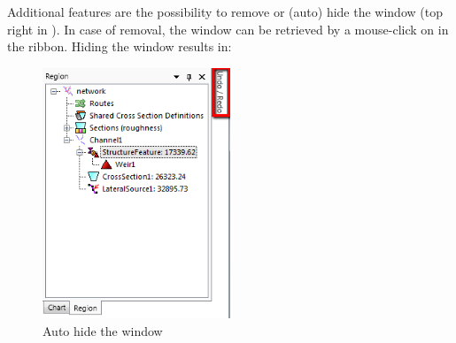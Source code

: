 %
Additional features are the possibility to remove or (auto) hide the window (top right in ). In case of removal, the window can be retrieved by a mouse-click on  in the  ribbon. Hiding the  window results in:
%
\begin{figure} [H]
	\centering
		\includegraphics[width=0.5\textwidth]{figures/chapter_overview/example_autohide.png}
	\caption{Auto hide the  window}
\end{figure}